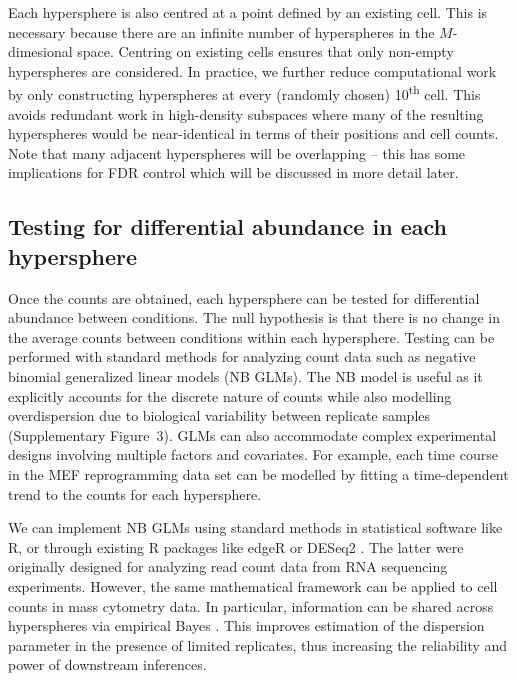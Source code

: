 \documentclass{article}
\newcommand{\suppfignbdisp}{3}
\begin{document}
Each hypersphere is also centred at a point defined by an existing cell.
This is necessary because there are an infinite number of hyperspheres in the $M$-dimesional space.
Centring on existing cells ensures that only non-empty hyperspheres are considered.
In practice, we further reduce computational work by only constructing hyperspheres at every (randomly chosen) 10\textsuperscript{th} cell.
This avoids redundant work in high-density subspaces where many of the resulting hyperspheres would be near-identical in terms of their positions and cell counts.
Note that many adjacent hyperspheres will be overlapping -- this has some implications for FDR control which will be discussed in more detail later.

\subsection{Testing for differential abundance in each hypersphere}
Once the counts are obtained, each hypersphere can be tested for differential abundance between conditions.
The null hypothesis is that there is no change in the average counts between conditions within each hypersphere.
Testing can be performed with standard methods for analyzing count data such as negative binomial generalized linear models (NB GLMs).
The NB model is useful as it explicitly accounts for the discrete nature of counts while also modelling overdispersion due to biological variability between replicate samples (Supplementary Figure~\suppfignbdisp{}).
GLMs can also accommodate complex experimental designs involving multiple factors and covariates.
For example, each time course in the MEF reprogramming data set can be modelled by fitting a time-dependent trend to the counts for each hypersphere.

We can implement NB GLMs using standard methods in statistical software like R, or through existing R packages like edgeR \cite{robinson2010edgeR} or DESeq2 \cite{love2014moderated}.
The latter were originally designed for analyzing read count data from RNA sequencing experiments.
However, the same mathematical framework can be applied to cell counts in mass cytometry data.
In particular, information can be shared across hyperspheres via empirical Bayes \cite{mccarthy2012differential, lund2012detecting}.
This improves estimation of the dispersion parameter in the presence of limited replicates, thus increasing the reliability and power of downstream inferences.
\end{document}
